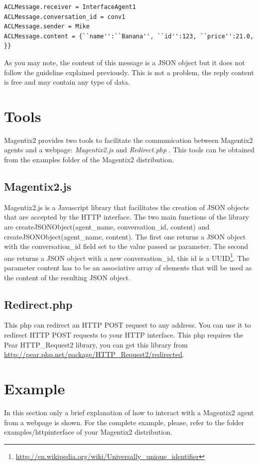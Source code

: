 \begin{lstlisting}
ACLMessage.receiver = InterfaceAgent1
ACLMessage.conversation_id = conv1
ACLMessage.sender = Mike
ACLMessage.content = {``name'':``Banana'', ``id'':123, ``price'':21.0, }}
\end{lstlisting}

As you may note, the content of this message is a JSON object but it does not follow the guideline explained previously. This is not a problem, the reply content is free and may contain any type of data.

\section{Tools}
Magentix2 provides two tools to facilitate the communication between Magentix2 agents and a webpage: \textit{Magentix2.js} and \textit{Redirect.php} . This tools can be obtained from the examples folder of the Magentix2 distribution. 

\subsection{Magentix2.js}
Magentix2.js is a Javascript library that facilitates the creation of JSON objects that are accepted by the HTTP interface. The two main functions of the library are createJSONObject(agent\_name, conversation\_id, content) and createJSONObject(agent\_name, content). The first one returns a JSON object with the conversation\_id field set to the value passed as parameter. The second one returns a JSON object with a new conversation\_id, this id is a UUID\footnote{\url{http://en.wikipedia.org/wiki/Universally_unique_identifier}}. The parameter content has to be an associative array of elements that will be used as the content of the resulting JSON object.

\subsection{Redirect.php}
This php can redirect an HTTP POST request to any address. You can use it to redirect HTTP POST requests to your HTTP interface. This php requires the Pear HTTP\_Request2 library, you can get this library from \url{http://pear.php.net/package/HTTP_Request2/redirected}.

\section{Example}
In this section only a brief explanation of how to interact with a Magentix2 agent from a webpage is shown. For the complete example, please, refer to the folder examples/httpinterface of your Magentix2 distribution.

